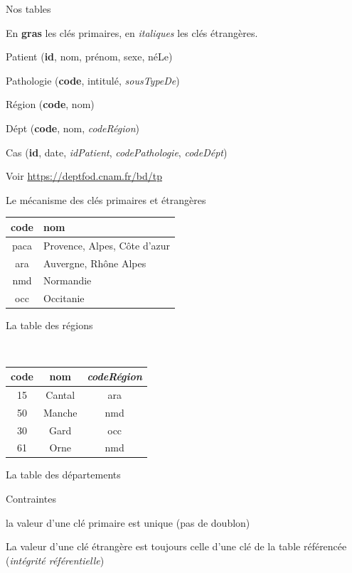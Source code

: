 \begin{frame}{Nos tables}


En \textbf{gras} les \alert{clés primaires}, en \textit{italiques} les
\alert{clés étrangères}.

\vfill

\begin{redbullet}
  \item Patient (\textbf{id}, nom, prénom, sexe, néLe)
  \item Pathologie (\textbf{code}, intitulé, \textit{sousTypeDe})
  \item Région (\textbf{code}, nom)
  \item Dépt (\textbf{code}, nom, \textit{codeRégion})
  \item Cas (\textbf{id}, date, \textit{idPatient}, \textit{codePathologie}, \textit{codeDépt})
\end{redbullet}

\vfill

Voir \url{https://deptfod.cnam.fr/bd/tp}
\end{frame}

\begin{frame}{Le mécanisme des clés primaires et étrangères}
 

\begin{minipage}[t]{7cm}
\begin{tabular}{c|p{5cm}}
\textbf{code} & nom \\ \hline
 paca  & Provence, Alpes, Côte d'azur\\
ara & Auvergne, Rhône Alpes\\
nmd & Normandie\\
occ & Occitanie\\
\hline
\end{tabular}
La table des régions
\end{minipage} \
\begin{minipage}[t]{5cm}


\begin{tabular}{c|c|c}
\textbf{code} & nom & \textit{codeRégion} \\ \hline
 15  & Cantal & ara \\
50 & Manche & nmd\\
30 & Gard & occ\\
61 & Orne & nmd
\\
\hline
\end{tabular}
La table des départements
\end{minipage}

\vfill

\begin{remblock}{Contraintes}
\begin{redbullet}
  \item la valeur d'une clé primaire est unique (pas de doublon)
 \item La valeur d'une clé étrangère est \alert{toujours} celle
d'une clé de la table référencée (\emph{intégrité référentielle})
\end{redbullet}
\end{remblock}
\end{frame}

